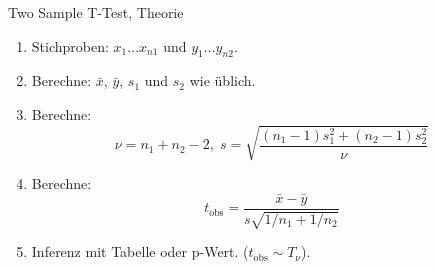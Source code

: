 \documentclass[handout]{beamer}
\begin{document}
%
%
%
%

\begin{frame}{Two Sample T-Test, Theorie}
\begin{enumerate}
\item Stichproben: $x_1\ldots x_{n1}$ und $y_1\ldots y_{n2}$.
\item Berechne: $\bar{x}$, $\bar{y}$, $s_1$ und $s_2$ wie üblich.
\item Berechne: 
$$
\nu=n_1+n_2-2,\;
s=\sqrt{\frac{(n_1-1)s_1^2+(n_2-1)s_2^2}{\nu}}
$$

\item Berechne:
$$
t_\text{obs}=\frac{\bar{x}-\bar{y}}{s\sqrt{1/n_1+1/n_2}}
$$
\item Inferenz mit Tabelle oder p-Wert. ($t_\text{obs}\sim T_\nu$).
\end{enumerate}
\end{frame}
\end{document}
